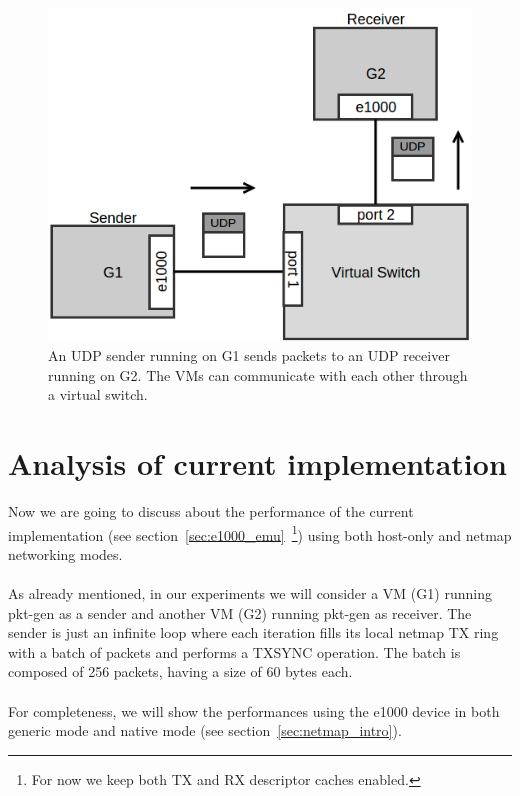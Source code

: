 \documentclass[a4paper, 12pt, titlepage]{report}
\begin{document}
\begin{figure}[!ht]
	\centering
	\includegraphics[scale=0.5]{img/g2g_comm.png}
	\caption{An UDP sender running on G1 sends packets to an UDP receiver running on G2. The VMs can communicate with each other through a virtual switch.}
	\label{img:g2g_comm}
\end{figure}
\section{Analysis of current implementation}
Now we are going to discuss about the performance of the current implementation (see section~\ref{sec:e1000_emu}~\footnote{For now we keep both TX and RX descriptor caches enabled.}) using both host-only and netmap networking modes.
\\
\\
As already mentioned, in our experiments we will consider a VM (G1) running pkt-gen as a sender and another VM (G2) running pkt-gen as receiver. The sender is just an infinite loop where each iteration fills its local netmap TX ring with a batch of packets and performs a TXSYNC operation. The batch is composed of 256 packets, having a size of 60 bytes each.\\
\\
For completeness, we will show the performances using the e1000 device in both generic mode and native mode (see section~\ref{sec:netmap_intro}).

\end{document}
